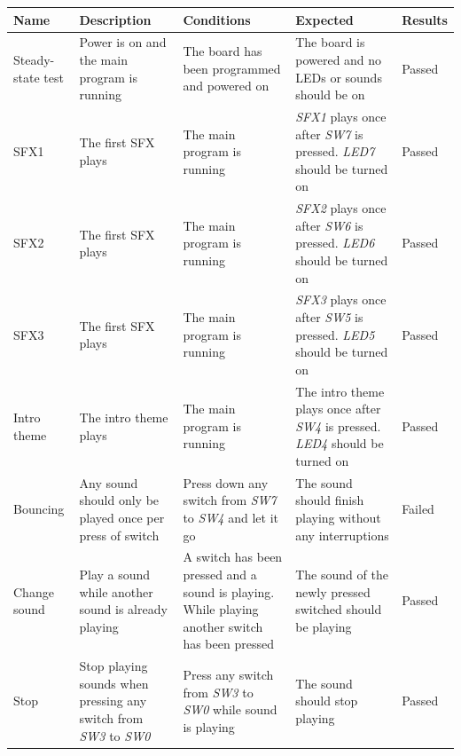 \documentclass[a4paper,11pt]{article}
\begin{document}
\begin{center}
\footnotesize
\renewcommand{\arraystretch}{1.25} %
\begin{tabular}[pos]{|m{45pt}|m{80pt}|m{90pt}|m{105pt}|m{60pt}|}
\hline  \textbf{Name} & \textbf{Description} & \textbf{Conditions} & \textbf{Expected} & \textbf{Results} \\ 

\hline Steady-state test & Power is on and the main program is running & The board has been programmed and powered on & The board is powered and no LEDs or sounds should be on & Passed \\

\hline SFX1 & The first SFX plays & The main program is running & \emph{SFX1} plays once after \emph{SW7} is pressed. \emph{LED7} should be turned on & Passed \\

\hline SFX2 & The first SFX plays & The main program is running & \emph{SFX2} plays once after \emph{SW6} is pressed. \emph{LED6} should be turned on & Passed \\

\hline SFX3 & The first SFX plays & The main program is running & \emph{SFX3} plays once after \emph{SW5} is pressed. \emph{LED5} should be turned on & Passed \\ 

\hline Intro theme & The intro theme plays & The main program is running & The intro theme plays once after \emph{SW4} is pressed. \emph{LED4} should be turned on & Passed \\

\hline Bouncing & Any sound should only be played once per press of switch & Press down any switch from \emph{SW7} to \emph{SW4} and let it go & The sound should finish playing without any interruptions & Failed \\

\hline Change sound & Play a sound while another sound is already playing & A switch has been pressed and a sound is playing. While playing another switch has been pressed & The sound of the newly pressed switched should be playing & Passed \\ 

\hline Stop & Stop playing sounds when pressing any switch from \emph{SW3} to \emph{SW0} & Press any switch from \emph{SW3} to \emph{SW0} while sound is playing & The sound should stop playing & Passed \\ 

\hline 
\end{tabular} 
\end{center}
\end{document}
